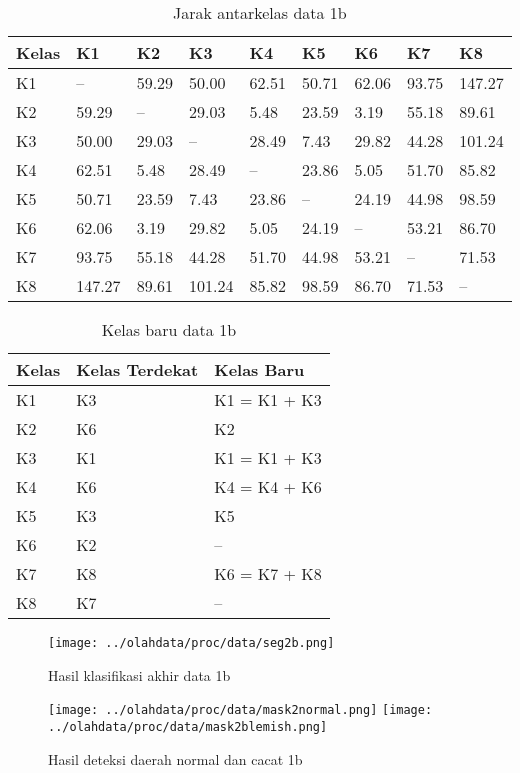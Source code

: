 \documentclass[laporan.tex]{subfiles}
\begin{document}
\begin{table}[h!]
\centering
\begin{tabular}{|l|l|l|l|l|l|l|l|l|}
\hline
Kelas & K1 & K2 & K3 & K4 & K5 & K6 & K7 & K8 \\
\hline
K1 & -- & 59.29 & 50.00 & 62.51 & 50.71 & 62.06 & 93.75 & 147.27 \\
K2 & 59.29 & -- & 29.03 & 5.48 & 23.59 & 3.19 & 55.18 & 89.61 \\
K3 & 50.00 & 29.03 & -- & 28.49 & 7.43 & 29.82 & 44.28 & 101.24 \\
K4 & 62.51 & 5.48 & 28.49 & -- & 23.86 & 5.05 & 51.70 & 85.82 \\
K5 & 50.71 & 23.59 & 7.43 & 23.86 & -- & 24.19 & 44.98 & 98.59 \\
K6 & 62.06 & 3.19 & 29.82 & 5.05 & 24.19 & -- & 53.21 & 86.70 \\
K7 & 93.75 & 55.18 & 44.28 & 51.70 & 44.98 & 53.21 & -- & 71.53 \\
K8 & 147.27 & 89.61 & 101.24 & 85.82 & 98.59 & 86.70 & 71.53 & -- \\
\hline
\end{tabular}
\caption[]{Jarak antarkelas data 1b}
\label{table:distlow}
\end{table}

\begin{table}[h!]
\centering
\begin{tabular}{|l|l|l|}
\hline
Kelas & Kelas Terdekat & Kelas Baru \\
\hline
K1 & K3 & K1 = K1 + K3 \\
K2 & K6 & K2 \\
K3 & K1 & K1 = K1 + K3 \\
K4 & K6 & K4 = K4 + K6 \\
K5 & K3 & K5 \\
K6 & K2 & -- \\
K7 & K8 & K6 = K7 + K8 \\
K8 & K7 & -- \\
\hline
\end{tabular}
\caption[]{Kelas baru data 1b}
\end{table}


\begin{figure}[h!]
\centering
\texttt{[image: ../olahdata/proc/data/seg2b.png]}
\caption[]{Hasil klasifikasi akhir data 1b}
\end{figure}

\begin{figure}[h!]
\centering
\texttt{[image: ../olahdata/proc/data/mask2normal.png]} \qquad
\texttt{[image: ../olahdata/proc/data/mask2blemish.png]}
\caption[]{Hasil deteksi daerah normal dan cacat 1b}
\end{figure}
\end{document}
